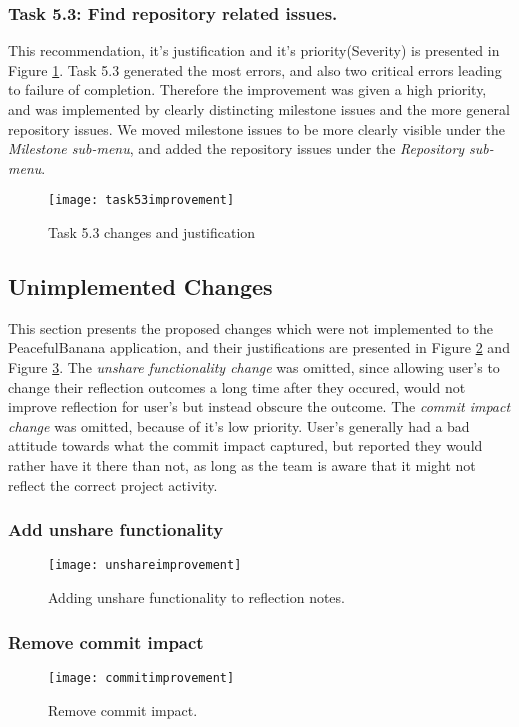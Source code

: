 \subsubsection*{Task 5.3: Find repository related issues.} 
This recommendation, it's justification and it's priority(Severity) is presented in Figure \ref{task53improvement}. Task 5.3 generated the most errors, and also two critical errors leading to failure of completion. Therefore the improvement was given a high priority, and was implemented by clearly distincting milestone issues and the more general repository issues. We moved milestone issues to be more clearly visible under the \emph{Milestone sub-menu}, and added the repository issues under the \emph{Repository sub-menu}. 
\begin{figure}[H]
    \centering
        \texttt{[image: task53improvement]}
    \caption{Task 5.3 changes and justification}
    \label{task53improvement}
\end{figure}

\subsection*{Unimplemented Changes}
This section presents the proposed changes which were not implemented to the PeacefulBanana application, and their justifications are presented in Figure \ref{unshareimprovement} and Figure \ref{commitimprovement}. The \emph{unshare functionality change} was omitted, since allowing user's to change their reflection outcomes a long time after they occured, would not improve reflection for user's but instead obscure the outcome. The \emph{commit impact change} was omitted, because of it's low priority. User's generally had a bad attitude towards what the commit impact captured, but reported they would rather have it there than not, as long as the team is aware that it might not reflect the correct project activity. 
\subsubsection*{Add unshare functionality}
\begin{figure}[h!]
    \centering
        \texttt{[image: unshareimprovement]}
    \caption{Adding unshare functionality to reflection notes.}
    \label{unshareimprovement}
\end{figure}

\subsubsection*{Remove commit impact}
\begin{figure}[h!]
    \centering
        \texttt{[image: commitimprovement]}
    \caption{Remove commit impact.}
    \label{commitimprovement}
\end{figure}

